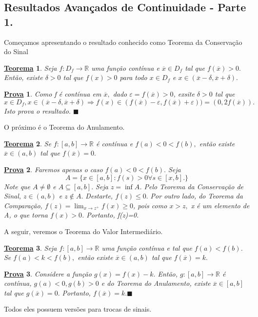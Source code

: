 \documentclass{article}
\newtheorem*{theorem*}{\underline{Teorema}}
\newtheorem*{proof*}{\underline{Prova}}
\renewcommand\qedsymbol{$\blacksquare$}
\begin{document}
\subsection{Resultados Avan\c cados de Continuidade - Parte 1.}
Come\c camos apresentando o resultado conhecido como Teorema da Conserva\c c\~ao do Sinal
 \begin{theorem*}
   Seja $f:D_{f}\rightarrow \mathbb{R}$ uma fun\c c\~ao cont\'inua e $\overline{x}\in D_{f}$ tal que $f(\overline{x})>0.$ 
   Ent\~ao, existe $\delta>0$ tal que $f(x)>0$ para todo $x\in D_{f}$ e $x\in(\overline{x}-\delta, \overline{x}+\delta).$
 \end{theorem*}
 \begin{proof*}
   Como f \'e cont\'inua em $\overline{x},$ dado $\varepsilon = f(\overline{x}) >0$, exsite $\delta > 0$ tal que 
     $$
       x\in D_{f}, x\in(\overline{x}-\delta, \overline{x}+\delta) \Rightarrow f(x)\in (f(\overline{x})-\varepsilon, f(\overline{x})+\varepsilon)) =
  (0, 2f(\overline{x})).
     $$
     Isto prova o resultado. \qedsymbol
 \end{proof*}
 O pr\'oximo \'e o Teorema do Anulamento.
 \begin{theorem*}
   Se $f:[a,b]\rightarrow \mathbb{R}$ \'e cont\'inua e $f(a)<0<f(b),$ ent\~ao existe $\overline{x}\in(a, b)$ tal que $f(\overline{x}) =0.$
 \end{theorem*}
\begin{proof*}
  Faremos apenas o caso $f(a)<0<f(b).$ Seja 
    $$
    A = \{x\in[a,b]:f(s)>0 \forall s\in[x, b].\}
    $$
    Note que $A\neq\emptyset$ e $A\subseteq{[a, b]}.$ Seja $z =\inf{A}$. Pelo Teorema da Conserva\c c\~ao de Sinal,
    $z\in(a, b)$ e $z\not\in A.$ Destarte, $f(z)\leq{0}.$ Por outro lado, do Teorema da Compara\c c\~ao, $f(z)=
    \lim_{x\to z^{+}}f(x)\geq{0}$, pois como $x > z,$ x \'e um elemento de A, o que torna $f(x)>0$. Portanto, f(z)=0.
\end{proof*}
 A seguir, veremos o Teorema do Valor Intermedi\'ario.
\begin{theorem*}
  Seja $f:[a, b]\rightarrow \mathbb{R}$ uma fun\c c\~ao cont\'inua e tal que  $f(a)<f(b)$. Se $f(a)<k<f(b),$
  ent\~ao existe $\overline{x}\in(a, b)$ tal que $f(\overline{x})=k.$
\end{theorem*}
\begin{proof*}
  Considere a fun\c c\~ao $g(x)=f(x)-k.$ Ent\~ao, $g:[a, b]\rightarrow \mathbb{R}$ \'e cont\'inua, $g(a)<0, g(b)>0$
  e do Teorema do Anulamento, existe $\overline{x}\in[a, b]$ tal que $g(\overline{x})=0.$ Portanto, $f(\overline{x})=k.$\qedsymbol
\end{proof*}
Todos eles possuem vers\~oes para trocas de sinais.
\newpage
\end{document}
